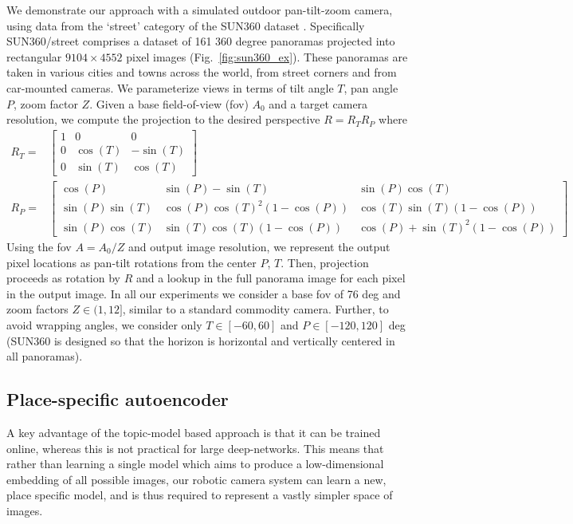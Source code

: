 We demonstrate our approach with a simulated outdoor pan-tilt-zoom camera, using data from the `street' category of the SUN360 dataset \citep{SUN360}. Specifically SUN360/street comprises a dataset of 161 360 degree panoramas projected into rectangular $9104 \times 4552$ pixel images (Fig.~\ref{fig:sun360_ex}). These panoramas are taken in various cities and towns across the world, from street corners and from car-mounted cameras. We parameterize views in terms of tilt angle $T$, pan angle $P$, zoom factor $Z$. Given a base field-of-view (fov) $A_0$ and a target camera resolution, we compute the projection to the desired perspective $R = R_TR_P$ where
\begin{equation}
\begin{split}
R_T =& 
\begin{bmatrix}
1 & 0 & 0\\
0 & \cos(T) & -\sin(T)\\
0 & \sin(T) & \cos(T)
\end{bmatrix}\\
R_P =&  
\begin{bmatrix}
\cos(P)        & \sin(P) - \sin(T)            & \sin(P)\cos(T)\\
\sin(P)\sin(T) & \cos(P)\cos(T)^2(1 -\cos(P)) & \cos(T)\sin(T)(1-\cos(P))\\
\sin(P)\cos(T) & \sin(T)\cos(T)(1-\cos(P))    & \cos(P)+\sin(T)^2(1-\cos(P))
\end{bmatrix}
\end{split}
\end{equation}
Using the fov $A = A_0/Z$ and output image resolution, we represent the output pixel locations as pan-tilt rotations from the center $P$, $T$. Then, projection proceeds as rotation by $R$ and a lookup in the full panorama image for each pixel in the output image. In all our experiments we consider a base fov of 76 deg and zoom factors $Z \in (1, 12]$, similar to a standard commodity camera. Further, to avoid wrapping angles, we consider only $T \in [-60, 60]$ and $P \in [-120, 120]$ deg (SUN360 is designed so that the horizon is horizontal and vertically centered in all panoramas).

\subsection{Place-specific autoencoder}

A key advantage of the topic-model based approach is that it can be trained online, whereas this is not practical for large deep-networks. This means that rather than learning a single model which aims to produce a low-dimensional embedding of all possible images, our robotic camera system can learn a new, place specific model, and is thus required to represent a vastly simpler space of images.

